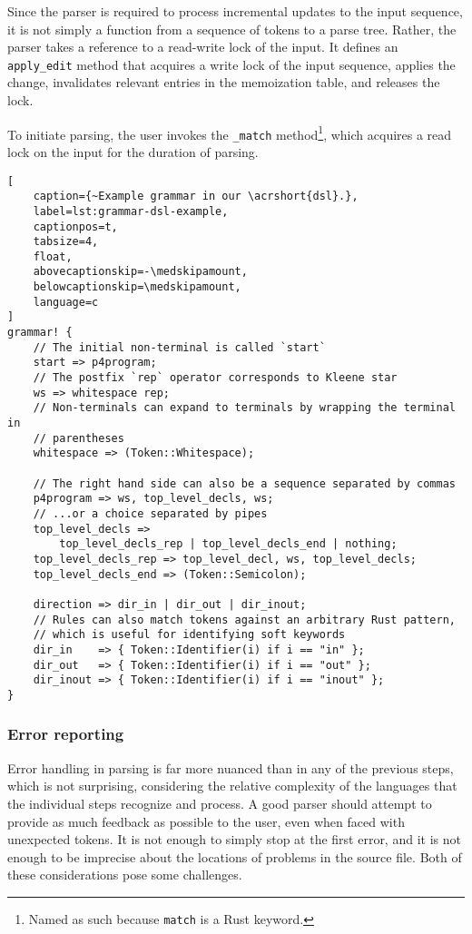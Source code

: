 Since the parser is required to process incremental updates to the input
sequence, it is not simply a function from a sequence of tokens to a parse tree.
Rather, the parser takes a reference to a read-write lock of the input. It
defines an \texttt{apply\_edit} method that acquires a write lock of the input
sequence, applies the change, invalidates relevant entries in the memoization
table, and releases the lock.

To initiate parsing, the user invokes the \texttt{\_match} method\footnote{Named
as such because \texttt{match} is a Rust keyword.}, which acquires a read lock
on the input for the duration of parsing.


\begin{lstlisting}[
	caption={~Example grammar in our \acrshort{dsl}.},
	label=lst:grammar-dsl-example,
	captionpos=t,
	tabsize=4,
	float,
	abovecaptionskip=-\medskipamount,
	belowcaptionskip=\medskipamount,
	language=c
]
grammar! {
	// The initial non-terminal is called `start`
	start => p4program;
	// The postfix `rep` operator corresponds to Kleene star
	ws => whitespace rep;
	// Non-terminals can expand to terminals by wrapping the terminal in
	// parentheses
	whitespace => (Token::Whitespace);

	// The right hand side can also be a sequence separated by commas
	p4program => ws, top_level_decls, ws;
	// ...or a choice separated by pipes
	top_level_decls =>
		top_level_decls_rep | top_level_decls_end | nothing;
	top_level_decls_rep => top_level_decl, ws, top_level_decls;
	top_level_decls_end => (Token::Semicolon);

	direction => dir_in | dir_out | dir_inout;
	// Rules can also match tokens against an arbitrary Rust pattern,
	// which is useful for identifying soft keywords
	dir_in    => { Token::Identifier(i) if i == "in" };
	dir_out   => { Token::Identifier(i) if i == "out" };
	dir_inout => { Token::Identifier(i) if i == "inout" };
}
\end{lstlisting}


\subsubsection*{Error reporting}

Error handling in parsing is far more nuanced than in any of the previous steps,
which is not surprising, considering the relative complexity of the languages
that the individual steps recognize and process. A good parser should attempt to
provide as much feedback as possible to the user, even when faced with
unexpected tokens. It is not enough to simply stop at the first error, and it is
not enough to be imprecise about the locations of problems in the source file.
Both of these considerations pose some challenges.

